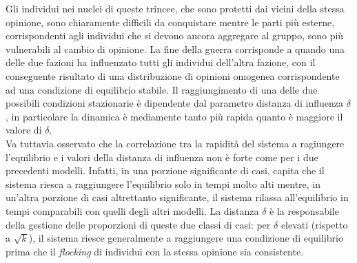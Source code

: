 \documentclass[letterpaper,10pt]{article}
\begin{document}
Gli individui nei nuclei di queste trincee, che sono protetti dai vicini della stessa opinione, sono chiaramente difficili da conquistare mentre le parti più esterne, corrispondenti agli individui che si devono ancora aggregare al gruppo, sono più vulnerabili al cambio di opinione. La fine della guerra corrisponde a quando una delle due fazioni ha influenzato tutti gli individui dell'altra fazione, con il conseguente risultato di una distribuzione di opinioni omogenea corrispondente ad una condizione di equilibrio stabile. Il raggiungimento di una delle due possibili condizioni stazionarie è dipendente dal parametro distanza di influenza $\delta$,  in particolare la dinamica è mediamente tanto più rapida quanto è maggiore il valore di $\delta$.\medskip
\\Va tuttavia osservato che la correlazione tra la rapidità del sistema a ragiungere l'equilibrio e i valori della distanza di influenza non è forte come per i due precedenti modelli. Infatti, in una porzione significante di casi, capita che il sistema riesca a raggiungere l'equilibrio solo in tempi molto alti mentre, in un'altra porzione di casi altrettanto significante, il sistema rilassa all'equilibrio in tempi comparabili con quelli degli altri modelli. La distanza $\delta$ è la responsabile della gestione delle proporzioni di queste due classi di casi: per $\delta$ elevati (rispetto a \textit{$\sqrt k$}), il sistema riesce generalmente a raggiungere una condizione di equilibrio prima che il \textit{flocking} di individui con la stessa opinione sia consistente.
\end{document}
